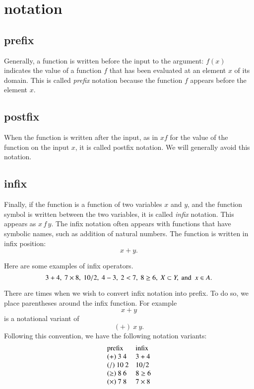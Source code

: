 \documentclass[cup9a]{cupbook}
\begin{document}
\section{notation}

\subsection{prefix}

Generally, a function is written before the input to the argument:
$f(x)$ indicates the value of a function $f$ that has been evaluated
at an element $x$ of its domain.  This is called {\it prefix} notation
because the function $f$ appears before the element $x$.  

\subsection{postfix}

When the function is written after the input, as in $x f$ for the value of the function on the input $x$, it is called postfix notation.  We will generally avoid this notation.

\subsection{infix}

Finally, if the function is a function of two variables $x$ and $y$, and the function symbol is written between the two variables, it is called {\it infix} notation.  This appears as $x\,f\, y$.    The infix notation often appears with functions that have symbolic names, such as addition of natural numbers.  The function is written in infix position:
  $$x + y.$$

Here are some examples of infix operators.
$$
3+4,\ 7\times 8,\ 10/2,\ 4 - 3,\ 2 < 7,\ 8\ge 6,\ X\subset Y, \hbox{ and } \ x\in A.
$$

There are times when we wish to convert infix notation into prefix.  To do so, we place parentheses around the infix function.   For example
$$
x + y
$$
is a notational variant of
$$
(+)~x~y.
$$
Following this convention, we have the following notation variants:
$$
\begin{array}{lll}
\hbox{prefix} & \hbox{infix}\\
(+)~3~4 & 3 + 4\\
(/)~10~2 & 10/2\\
(\ge)~8~6 & 8 \ge 6\\
(\times)~7~8 & 7\times 8\\
\end{array}
$$
\end{document}
